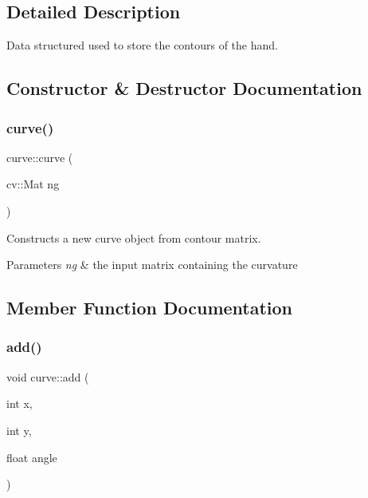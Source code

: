 \subsection{Detailed Description}
Data structured used to store the contours of the hand. 

\subsection{Constructor \& Destructor Documentation}
\hypertarget{structcurve_aa067033135a192272005a3ae557a4f25}{}\label{structcurve_aa067033135a192272005a3ae557a4f25} 
\subsubsection{\texorpdfstring{curve()}{curve()}}
{\footnotesize\ttfamily curve\+::curve (\begin{DoxyParamCaption}\item[{cv\+::\+Mat}]{ng }\end{DoxyParamCaption})}



Constructs a new curve object from contour matrix. 


\begin{DoxyParams}{Parameters}
{\em ng} & the input matrix containing the curvature \\
\hline
\end{DoxyParams}


\subsection{Member Function Documentation}
\hypertarget{structcurve_aa4847c1d83d062c243ef641f67144cd0}{}\label{structcurve_aa4847c1d83d062c243ef641f67144cd0} 
\subsubsection{\texorpdfstring{add()}{add()}}
{\footnotesize\ttfamily void curve\+::add (\begin{DoxyParamCaption}\item[{int}]{x,  }\item[{int}]{y,  }\item[{float}]{angle }\end{DoxyParamCaption})}



